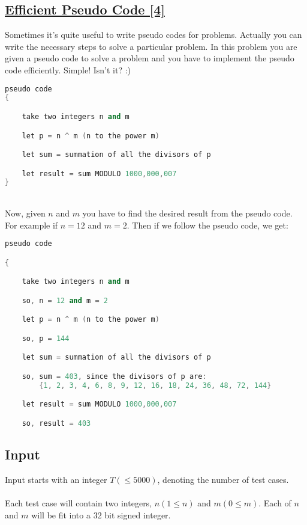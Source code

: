 \documentclass[10pt,a4paper]{article}
\begin{document}
\begin{itemize}
\subsection*{\href{https://lightoj.com/problem/efficient-pseudo-code}{\underline{Efficient Pseudo Code [4]}}}

Sometimes it's quite useful to write pseudo codes for problems. Actually you can write the necessary steps to solve a particular problem. In this problem you are given a pseudo code to solve a problem and you have to implement the pseudo code efficiently. Simple! Isn't it? :)
\\

\begin{lstlisting}[language=C++, label={1st:code}, mathescape=true, breaklines=true]
pseudo code
{

    take two integers n and m

    let p = n ^ m (n to the power m)

    let sum = summation of all the divisors of p

    let result = sum MODULO 1000,000,007
}
\end{lstlisting}
\\
Now, given $n$ and $m$ you have to find the desired result from the pseudo code. For example if $n = 12$ and $m = 2$. Then if we follow the pseudo code, we get:

\begin{lstlisting}[language=C++, label={1st:code}, mathescape=true, breaklines=true]
pseudo code

{

    take two integers n and m

    so, n = 12 and m = 2

    let p = n ^ m (n to the power m)

    so, p = 144

    let sum = summation of all the divisors of p

    so, sum = 403, since the divisors of p are:
        {1, 2, 3, 4, 6, 8, 9, 12, 16, 18, 24, 36, 48, 72, 144}

    let result = sum MODULO 1000,000,007

    so, result = 403

\end{lstlisting}


\subsection*{Input}
Input starts with an integer $T (\leq 5000)$, denoting the number of test cases.
\\ \\
Each test case will contain two integers, $n (1 \leq n)$ and $m (0 \leq m)$. Each of $n$ and $m$ will be fit into a 32 bit signed integer.


\end{itemize}
\end{document}
